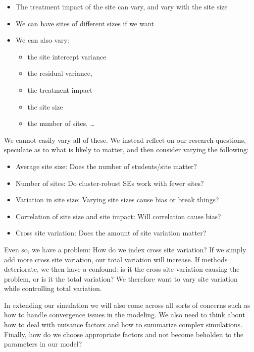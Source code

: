 \documentclass[
]{book}
\providecommand{\tightlist}{%
  \setlength{\itemsep}{0pt}\setlength{\parskip}{0pt}}
\begin{document}
\begin{itemize}
\item
  The treatment impact of the site can vary, and vary with the site size
\item
  We can have sites of different sizes if we want
\item
  We can also vary:

  \begin{itemize}
  \tightlist
  \item
    the site intercept variance
  \item
    the residual variance,
  \item
    the treatment impact
  \item
    the site size
  \item
    the number of sites, \ldots{}
  \end{itemize}
\end{itemize}

We cannot easily vary all of these.
We instead reflect on our research questions, speculate as to what is likely to matter, and then consider varying the following:

\begin{itemize}
\tightlist
\item
  Average site size: Does the number of students/site matter?
\item
  Number of sites: Do cluster-robust SEs work with fewer sites?
\item
  Variation in site size: Varying site sizes cause bias or break things?
\item
  Correlation of site size and site impact: Will correlation cause bias?
\item
  Cross site variation: Does the amount of site variation matter?
\end{itemize}

Even so, we have a problem: How do we index cross site variation?
If we simply add more cross site variation, our total variation will increase.
If methods deteriorate, we then have a confound: is it the cross site variation causing the problem, or is it the total variation?
We therefore want to vary site variation while controlling total variation.

In extending our simulation we will also come across all sorts of concerns such as how to handle convergence issues in the modeling.
We also need to think about how to deal with nuisance factors and how to summarize complex simulations.
Finally, how do we choose appropriate factors and not become beholden to the parameters in our model?
\end{document}
